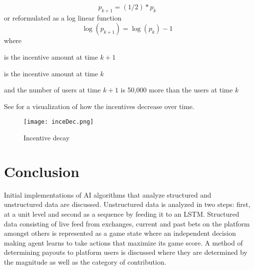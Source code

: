 \documentclass[a4paper]{article}
\begin{document}
\begin{equation}
p_{k+1}=(1/2)*p_k\label{eq:exp_decay}
\end{equation}
or reformulated as a log linear function 
\begin{equation}
\log (p_{k+1})=\log (p_k) - 1\label{eq:log_exp_decay}
\end{equation}
where
\begin{description}
	\item[~$p_{k+1}$] is the incentive amount at time $k+1$
	\item[~$p_k$] is the incentive amount at time $k$
	\item and the number of users at time $k+1$ is 50,000 more than the users at time $k$
\end{description}
See  for a visualization of how the incentives decrease over time.
\begin{figure}[h!] \centering
\texttt{[image: inceDec.png]}
\caption{Incentive decay} \label{fig:inc_dec}
\end{figure}

\section{Conclusion}
Initial implementations of AI algorithms that analyze structured and unstructured data are discussed. Unstructured data is analyzed in two steps: first, at a unit level and second as a sequence by feeding it to an LSTM. Structured data consisting of live feed from exchanges, current and past bets on the platform amongst others is represented as a game state where an independent decision making agent learns to take actions that maximize its game score. A method of determining payouts to platform users is discussed where they are determined by the magnitude as well as the category of contribution.




\end{document}
